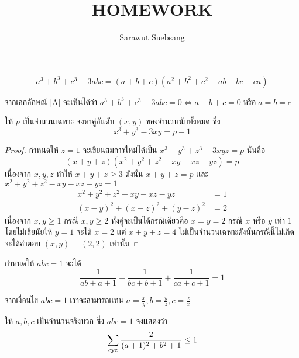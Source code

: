 \documentclass[a4paper,12pt]{scrartcl}
\title{\textbf{HOMEWORK}}
\author{Sarawut Suebsang}
\begin{document}
	
	\maketitle
	
	\begin{ID}
		
		\[ a^3 + b^3 + c^3 - 3abc = (a + b + c)(a^2 + b^2 + c^2 - ab - bc - ca)  \]
		\label{A}
		
	\end{ID}

จากเอกลักษณ์ \ref{A} จะเห็นได้ว่า $a^3 + b^3 + c^3 - 3abc = 0 \iff a + b + c = 0\; \textrm{หรือ} \; a = b = c$ 

\begin{example}
	
	ให้ $p$ เป็นจำนวนเฉพาะ จงหาคู่อันดับ $(x , y)$ ของจำนวนนับทั้งหมด ซึ่ง \[ x^3 + y^3 - 3xy = p - 1 \]
	
\end{example}

\begin{proof}
	
	กำหนดให้ $z = 1$ จะเขียนสมการใหม่ได้เป็น $x^3 + y^3 + z^3 - 3xyz = p$ นั่นคือ
		\[ (x + y + z)(x^2 + y^2 + z^2 - xy - xz - yz) = p\]
		เนื่องจาก $x , y , z$ ทำให้ $x + y + z \ge 3$ ดังนั้น $x + y + z = p$ เเละ $x^2 + y^2 + z^2 - xy - xz - yz = 1$
		\begin{align*}
			x^2 + y^2 + z^2 - xy - xz - yz &= 1 \\
			(x - y)^2 + (x - z)^2 + (y - z)^2 &= 2 
		\end{align*}
เนื่องจาก $x , y \ge 1$ กรณี $x ,y \ge 2$ ทั้งคู่จะเป็นได้กรณีเดียวคือ $x = y =2$ กรณี $x$ หรือ $y$ เท่า $1$ โดยไม่เสียนัยให้ $y = 1$ จะได้ $x = 2$ เเต่ $x + y + z = 4$ ไม่เป็นจำนวนเฉพาะดังนั้นกรณีนี้ไม่เกิดจะได้คำตอบ $(x , y) = (2 , 2)$ เท่านั้น   

\end{proof}

\begin{ID}
	กำหนดให้ $abc = 1$ จะได้
	\[  \frac{1}{ab+a+1} + \frac{1}{bc+b+1}  + \frac{1}{ca+c+1} = 1 \]
	\label{B}
\end{ID}

จากเงื่อนไข $abc = 1$ เราจะสามารถเเทน $ \textstyle a = \frac{x}{y}, b = \frac{y}{z}, c = \frac{z}{x}$

\begin{example}
	ให้ $a , b , c$ เป็นจำนวนจริงบวก ซึ่ง $abc = 1$ จงเเสดงว่า \[ \sum_{\mathrm{cyc}} \frac{2}{(a + 1)^2 + b^2 + 1} \le 1 \]
\end{example}
\end{document}
